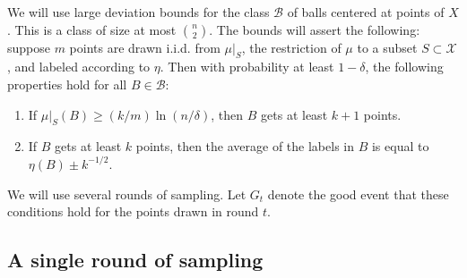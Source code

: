 \documentclass{article}
\def\X{{\mathcal X}}
\def\B{{\mathcal B}}
\begin{document}
We will use large deviation bounds for the class $\B$ of balls centered at points of $X$. This is a class of size at most ${n \choose 2}$. The bounds will assert the following: suppose $m$ points are drawn i.i.d. from $\mu|_S$, the restriction of $\mu$ to a subset $S \subset \X$, and labeled according to $\eta$. Then with probability at least $1-\delta$, the following properties hold for all $B \in \B$:
\begin{enumerate}
\item[(P1)] If $\mu|_S(B) \geq (k/m) \ln (n/\delta)$, then $B$ gets at least $k+1$ points.
\item[(P2)] If $B$ gets at least $k$ points, then the average of the labels in $B$ is equal to $\eta(B) \pm k^{-1/2}$.
\end{enumerate}
We will use several rounds of sampling. Let $G_t$ denote the good event that these conditions hold for the points drawn in round $t$.

\subsection{A single round of sampling}
\end{document}
